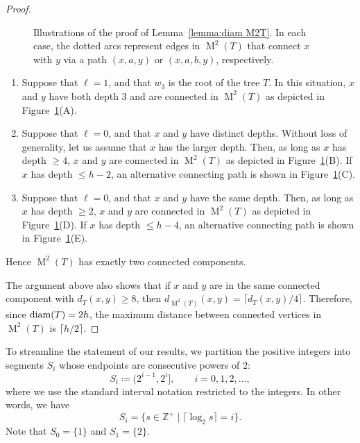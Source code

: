 \documentclass[12pt]{amsart}
\theoremstyle{definition}
\theoremstyle{remark}
\numberwithin{equation}{section}
\numberwithin{figure}{section}
\newcommand{\M}{\operatorname{M}}
\newcommand{\Z}{\mathbb{Z}}
\begin{document}
\begin{proof}
\begin{figure}[h!]
   
    \caption{Illustrations of the proof of Lemma~\ref{lemma:diam M2T}.
    In each case, the dotted arcs represent edges in $\M^2(T)$ that connect $x$ with $y$ via a path $(x,a,y)$ or $(x,a,b,y)$, respectively.}
    \label{fig:lemma 9.4}
\end{figure}

    \begin{enumerate}
        \item Suppose that $\ell=1$, and that $w_3$ is the root of the tree $T$. In this situation, $x$ and $y$ have both depth $3$ and are connected in $\M^2(T)$ as depicted in Figure~\ref{fig:lemma 9.4}(A).
        \item Suppose that $\ell=0$, and that $x$ and $y$ have distinct depths. Without loss of generality, let us assume that $x$ has the larger depth. Then, as long as $x$ has depth $\geq 4$, $x$ and $y$ are connected in $\M^2(T)$ as depicted in Figure~\ref{fig:lemma 9.4}(B). If $x$ has depth $\le h-2$, an alternative connecting path is shown in Figure~\ref{fig:lemma 9.4}(C).
        \item Suppose that $\ell=0$, and that $x$ and $y$ have the same depth. Then, as long as $x$ has depth $\geq 2$, $x$ and $y$ are connected in $\M^2(T)$ as depicted in Figure~\ref{fig:lemma 9.4}(D). If $x$ has depth $\le h-4$, an alternative connecting path is shown in Figure~\ref{fig:lemma 9.4}(E).
    \end{enumerate}
    Hence $\M^2(T)$ has exactly two connected components.
    
    The argument above also shows that if $x$ and $y$ are in the same connected component with $ d_T(x,y)\ge 8$, then $d_{\M^2(T)}(x,y) = \lceil d_T(x,y)/4 \rceil$.
    Therefore, since ${\rm diam}(T) = 2h$, the maximum distance between connected vertices in $\M^2(T)$ is $\lceil h/2 \rceil$.
\end{proof}


To streamline the statement of our results, we partition the positive integers into segments $S_i$ whose endpoints are consecutive powers of $2$:
\begin{equation}
    \label{Si}
    S_i \coloneqq (2^{i-1}, 2^i], \qquad i = 0, 1, 2, \ldots,
\end{equation}
where we use the standard interval notation restricted to the integers.
In other words, we have
\begin{equation}
\label{Si log def}
    S_i = \{ s \in \Z^+ \mid \lceil \log_2 s \rceil = i\}.
\end{equation}
Note that $S_0 = \{1\}$ and $S_1 = \{2\}$.
\end{document}
